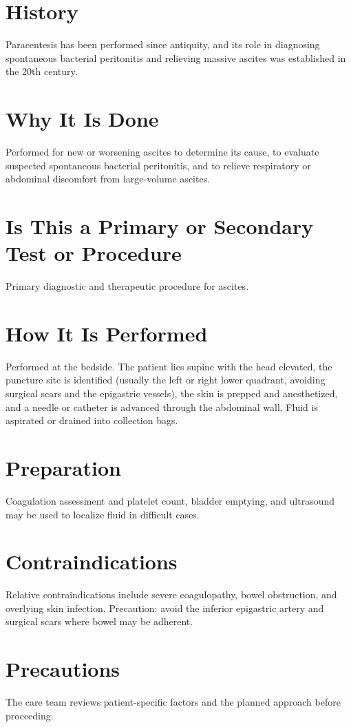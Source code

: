 \section*{History}
Paracentesis has been performed since antiquity, and its role in diagnosing spontaneous bacterial peritonitis and relieving massive ascites was established in the 20th century.

\section*{Why It Is Done}
Performed for new or worsening ascites to determine its cause, to evaluate suspected spontaneous bacterial peritonitis, and to relieve respiratory or abdominal discomfort from large-volume ascites.

\section*{Is This a Primary or Secondary Test or Procedure}
Primary diagnostic and therapeutic procedure for ascites.

\section*{How It Is Performed}
Performed at the bedside. The patient lies supine with the head elevated, the puncture site is identified (usually the left or right lower quadrant, avoiding surgical scars and the epigastric vessels), the skin is prepped and anesthetized, and a needle or catheter is advanced through the abdominal wall. Fluid is aspirated or drained into collection bags.

\section*{Preparation}
Coagulation assessment and platelet count, bladder emptying, and ultrasound may be used to localize fluid in difficult cases.

\section*{Contraindications}
Relative contraindications include severe coagulopathy, bowel obstruction, and overlying skin infection. Precaution: avoid the inferior epigastric artery and surgical scars where bowel may be adherent.

\section*{Precautions}
The care team reviews patient-specific factors and the planned approach before proceeding.

